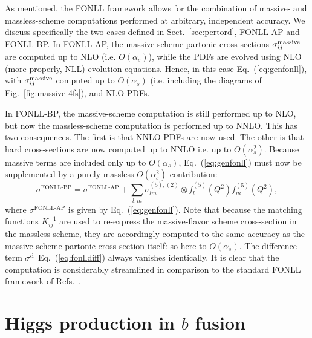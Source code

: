 As mentioned, the FONLL framework
allows for the combination of massive- and massless-scheme
computations performed at arbitrary, independent accuracy. We discuss
specifically the two cases defined in Sect.~\ref{sec:pertord}, FONLL-AP and
FONLL-BP. In FONLL-AP, the massive-scheme partonic cross sections 
 $\sigma_{ij}^{\rm massive}$ are computed up to NLO
(i.e. $O(\alpha_s)$), while the PDFs are evolved using 
NLO (more properly, NLL) evolution equations. Hence, in this case
Eq.~(\ref{eq:genfonll}), with  $\sigma_{ij}^{\rm massive}$ computed up
to $O(\alpha_s)$ (i.e. including the diagrams of
Fig.~\ref{fig:massive-4fs}), and NLO PDFs.  


In FONLL-BP, the
massive-scheme computation is still performed up to NLO, but now the
massless-scheme computation is performed up to NNLO. This has two
consequences. The first is that NNLO PDFs are now used. The other is
that hard cross-sections are now computed up to NNLO i.e. up to
$O(\alpha^2_s)$. Because massive terms are included only up to
$O(\alpha_s)$, Eq.~(\ref{eq:genfonll}) must now be supplemented by a
purely massless $O(\alpha^2_s)$ contribution:
\begin{equation}\label{eq:fonll-bp}
\sigma^{\text{FONLL-BP}}=\sigma^{\text{FONLL-AP}}+\sum_{l,m}
\sigma^{(5),(2)}_{lm}\otimes
f_{l}^{\left(5\right)}\left(Q^2\right)f_{m}^{\left(5\right)}\left(Q^2\right), 
\end{equation}
where $\sigma^{\text{FONLL-AP}}$ is given by
Eq.~(\ref{eq:genfonll}). Note that because the matching functions
$K_{ij}^{-1}$ are 
used to re-express the massive-flavor scheme cross-section in the
massless scheme, they are accordingly  computed to the same accuracy as
the massive-scheme partonic cross-section itself: so here
to $O(\alpha_s)$. The difference term $\sigma^{\rm d}$
Eq.~(\ref{eq:fonlldiff}) always vanishes identically. It is clear
that the computation is considerably streamlined in comparison to the
standard FONLL framework of Refs.~\cite{Forte:2015hba,Forte:2016sja}.

\section{Higgs production in $b$ fusion}
\label{sec:results}


